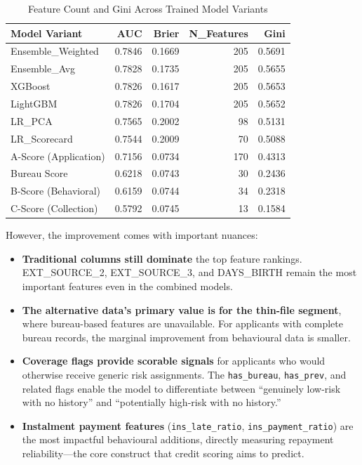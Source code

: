 \begin{table}[H]
\centering
\caption{Feature Count and Gini Across Trained Model Variants}
\label{tab:n_features_gini}
\begin{tabular}{lrrrr}
\toprule
\textbf{Model Variant} & \textbf{AUC} & \textbf{Brier} & \textbf{N\_Features} & \textbf{Gini} \\
\midrule
Ensemble\_Weighted & 0.7846 & 0.1669 & 205 & 0.5691 \\
Ensemble\_Avg & 0.7828 & 0.1735 & 205 & 0.5655 \\
XGBoost & 0.7826 & 0.1617 & 205 & 0.5653 \\
LightGBM & 0.7826 & 0.1704 & 205 & 0.5652 \\
LR\_PCA & 0.7565 & 0.2002 & 98 & 0.5131 \\
LR\_Scorecard & 0.7544 & 0.2009 & 70 & 0.5088 \\
A-Score (Application) & 0.7156 & 0.0734 & 170 & 0.4313 \\
Bureau Score & 0.6218 & 0.0743 & 30 & 0.2436 \\
B-Score (Behavioral) & 0.6159 & 0.0744 & 34 & 0.2318 \\
C-Score (Collection) & 0.5792 & 0.0745 & 13 & 0.1584 \\
\bottomrule
\end{tabular}
\end{table}

However, the improvement comes with important nuances:

\begin{itemize}
    \item \textbf{Traditional columns still dominate} the top feature rankings. EXT\_SOURCE\_2, EXT\_SOURCE\_3, and DAYS\_BIRTH remain the most important features even in the combined models.
    \item \textbf{The alternative data's primary value is for the thin-file segment}, where bureau-based features are unavailable. For applicants with complete bureau records, the marginal improvement from behavioural data is smaller.
    \item \textbf{Coverage flags provide scorable signals} for applicants who would otherwise receive generic risk assignments. The \texttt{has\_bureau}, \texttt{has\_prev}, and related flags enable the model to differentiate between ``genuinely low-risk with no history'' and ``potentially high-risk with no history.''
    \item \textbf{Instalment payment features} (\texttt{ins\_late\_ratio}, \texttt{ins\_payment\_ratio}) are the most impactful behavioural additions, directly measuring repayment reliability---the core construct that credit scoring aims to predict.
\end{itemize}

